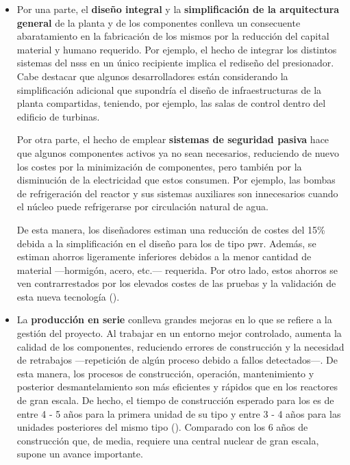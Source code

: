 \begin{itemize}
  \item Por una parte, el \textbf{diseño integral} y la \textbf{simplificación de la arquitectura general} de la planta y de los componentes conlleva un consecuente abaratamiento en la fabricación de los mismos por la reducción del capital material y humano requerido. Por ejemplo, el hecho de integrar los distintos sistemas del \acrshort{nsss} en un único recipiente implica el rediseño del presionador. Cabe destacar que algunos desarrolladores están considerando la simplificación adicional que supondría el diseño de infraestructuras de la planta compartidas, teniendo, por ejemplo, las salas de control dentro del edificio de turbinas.
  
  Por otra parte, el hecho de emplear \textbf{sistemas de seguridad pasiva} hace que algunos componentes activos ya no sean necesarios, reduciendo de nuevo los costes por la minimización de componentes, pero también por la disminución de la electricidad que estos consumen. Por ejemplo, las bombas de refrigeración del reactor y sus sistemas auxiliares son innecesarios cuando el núcleo puede refrigerarse por circulación natural de agua. 
  
  De esta manera, los diseñadores estiman una reducción de costes del 15\% debida a la simplificación en el diseño para los  de tipo \acrshort{pwr}. Además, se estiman ahorros ligeramente inferiores debidos a la menor cantidad de material ---hormigón, acero, etc.--- requerida. Por otro lado, estos ahorros se ven contrarrestados por los elevados costes de las pruebas y la validación de esta nueva tecnología (\cite{nea_market_potential}).

  \item La \textbf{producción en serie} conlleva grandes mejoras en lo que se refiere a la gestión del proyecto. Al trabajar en un entorno mejor controlado, aumenta la calidad de los componentes, reduciendo errores de construcción y la necesidad de retrabajos ---repetición de algún proceso debido a fallos detectados---. De esta manera, los procesos de construcción, operación, mantenimiento y posterior desmantelamiento son más eficientes y rápidos que en los reactores de gran escala. De hecho, el tiempo de construcción esperado para los  es de entre 4 - 5 años para la primera unidad de su tipo y entre 3 - 4 años para las unidades posteriores del mismo tipo (\cite{VEGEL2017395}). Comparado con los 6 años de construcción que, de media, requiere una central nuclear de gran escala, supone un avance importante. 
  

\end{itemize}
